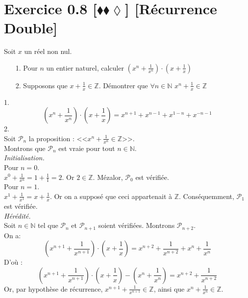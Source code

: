 \documentclass[10pt]{article}
\begin{document}
\section*{Exercice 0.8 [$\blacklozenge\blacklozenge\lozenge$] [Récurrence Double]}
\begin{tcolorbox}[enhanced, width=6in, center, size=fbox, fontupper=\large, drop shadow southwest]
    Soit $x$ un réel non nul.
    \begin{itemize}
        \item[1.] Pour $n$ un entier naturel, calculer $(x^n+\frac{1}{x^n})\cdot(x+\frac{1}{x})$
        \item[2.] Supposons que $x+\frac{1}{x}\in\mathbb{Z}$. Démontrer que $\forall n\in\mathbb{N}$ $x^n + \frac{1}{x}\in\mathbb{Z}$ 
    \end{itemize}
    1.
    \begin{equation*}
        (x^n + \frac{1}{x^n})\cdot(x+\frac{1}{x}) = x^{n+1}+x^{n-1}+x^{1-n}+x^{-n-1}
    \end{equation*}
    2.\\
    Soit $\mathcal{P}_n$ la proposition : <<$x^n+\frac{1}{x^n}\in\mathbb{Z}$>>.\\
    Montrons que $\mathcal{P}_n$ est vraie pour tout $n\in\mathbb{N}$.\\
    \emph{Initialisation.}\\
    Pour $n=0$.\\
    $x^0 + \frac{1}{x^n} = 1 + \frac{1}{1} = 2$. Or $2\in\mathbb{Z}$. Mézalor, $\mathcal{P}_0$ est vérifiée.\\
    Pour $n=1$.\\
    $x^1 + \frac{1}{x^1} = x + \frac{1}{x}$. Or on a supposé que ceci appartenait à $\mathbb{Z}$. Conséquemment, $\mathcal{P}_1$ est vérifiée.\\[0.5cm]
    \emph{Hérédité.}\\
    Soit $n\in\mathbb{N}$ tel que $\mathcal{P}_n$ et $\mathcal{P}_{n+1}$ soient vérifiées. Montrons $\mathcal{P}_{n+2}$.\\
    On a:
    \begin{equation*}
        (x^{n+1}+\frac{1}{x^{n+1}})\cdot(x+\frac{1}{x})=x^{n+2}+\frac{1}{x^{n+2}}+x^n+\frac{1}{x^{n}}
    \end{equation*}
    D'où :
    \begin{equation*}
        (x^{n+1}+\frac{1}{x^{n+1}})\cdot(x+\frac{1}{x})-(x^n+\frac{1}{x^n}) = x^{n+2}+\frac{1}{x^{n+2}}
    \end{equation*}
    Or, par hypothèse de récurrence, $x^{n+1}+\frac{1}{x^{n+1}}\in\mathbb{Z}$, ainsi que $x^n+\frac{1}{x^n}\in\mathbb{Z}$.\\

\end{tcolorbox}
\end{document}

